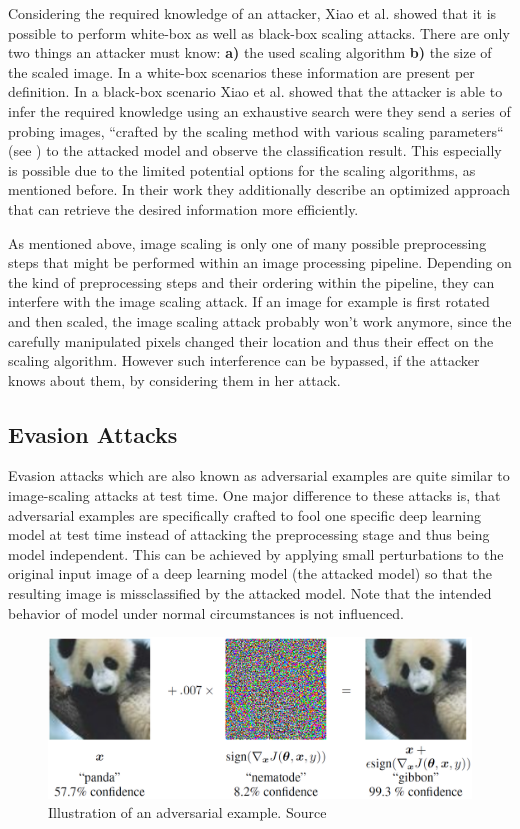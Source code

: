 \documentclass[sigconf]{acmart}
\begin{document}
Considering the required knowledge of an attacker, Xiao et al. showed that it is possible to perform white-box as well as black-box scaling attacks.
There are only two things an attacker must know:
 \textbf{a)} the used scaling algorithm
 \textbf{b)} the size of the scaled image.
In a white-box scenarios these information are present per definition.
In a black-box scenario Xiao et al. showed that the attacker is able to infer the required knowledge using an exhaustive search were they send a series of probing images, ``crafted by the scaling method with various scaling parameters`` (see \cite{camouflage}) to the attacked model and observe the classification result.
This especially is possible due to the limited potential options for the scaling algorithms, as mentioned before.
In their work they additionally describe an optimized approach that can retrieve the desired information more efficiently.

As mentioned above, image scaling is only one of many possible preprocessing steps that might be performed within an image processing pipeline.
Depending on the kind of preprocessing steps and their ordering within the pipeline, they can interfere with the image scaling attack.
If an image for example is first rotated and then scaled, the image scaling attack probably won't work anymore, since the carefully manipulated pixels changed their location and thus their effect on the scaling algorithm.
However such interference can be bypassed, if the attacker knows about them, by considering them in her attack.

\subsection{Evasion Attacks}
Evasion attacks which are also known as adversarial examples are quite similar to image-scaling attacks at test time.
One major difference to these attacks is, that adversarial examples are specifically crafted to fool one specific deep learning model at test time instead of attacking the preprocessing stage and thus being model independent.
This can be achieved by applying small perturbations to the original input image of a deep learning model (the attacked model) so that the resulting image is missclassified by the attacked model.
Note that the intended behavior of model under normal circumstances is not influenced.

\begin{figure}[h]
  \centering
  \includegraphics[width=\linewidth]{img/advex.png}
  \caption{Illustration of an adversarial example. Source \cite{43405}}
  \Description{}
\end{figure}
\end{document}
